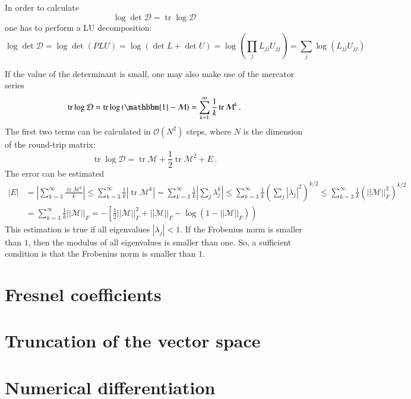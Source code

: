 \documentclass[superscriptaddress,prb]{revtex4-1}
\DeclareMathOperator{\trace}{tr}
\begin{document}
In order to calculate
\begin{equation}
\log\det\mathcal{D} = \trace\log\mathcal{D}
\end{equation}
one has to perform a LU decomposition:
\begin{equation}
\log\det\mathcal{D} = \log\det\left(PLU\right) = \log\left(\det L + \det U\right) = \log\left(\prod_j L_{jj} U_{jj}\right) = \sum_j \log\left(L_{jj} U_{jj}\right)
\end{equation}

If the value of the determinant is small, one may also make use of the mercator series
\begin{equation}
\trace\log \mathcal{D} = \trace\log\left(\mathbbm{1}-\mathcal{M}\right) = \sum_{k=1}^\infty \frac{1}{k} \trace\mathcal{M}^k \,.
\end{equation}
The first two terms can be calculated in $\mathcal{O}(N^2)$ steps, where $N$ is the dimension of the round-trip matrix:
\begin{equation}
\trace\log\mathcal{D} = \trace\mathcal{M} + \frac{1}{2} \trace\mathcal{M}^2 + E \,.
\end{equation}
The error can be estimated
\begin{align}
|E| &=  \left|\sum_{k=3}^\infty \frac{\trace\mathcal{M}^k}{k}\right|
\le \sum_{k=3}^\infty \frac{1}{k} \left| \trace\mathcal{M}^k \right|
= \sum_{k=3}^\infty \frac{1}{k} \left| \sum_j \lambda_j^k \right|
\le \sum_{k=3}^\infty \frac{1}{k} \left(\sum_j |\lambda_j|^2\right)^{k/2}
\le \sum_{k=3}^\infty \frac{1}{k} \left(||\mathcal{M}||_F^2\right)^{k/2} \\
&= \sum_{k=3}^\infty \frac{1}{k} ||\mathcal{M}||_F = -\left[\frac{1}{2}||\mathcal{M}||_F^2+||\mathcal{M}||_F -\log\left(1-||\mathcal{M}||_F\right)\right)
\end{align}
This estimation is true if all eigenvalues $|\lambda_j| < 1$. If the Frobenius
norm is smaller than $1$, then the modulus of all eigenvalues is smaller than
one. So, a sufficient condition is that the Frobenius norm is smaller than $1$.

\section{Fresnel coefficients}
\section{Truncation of the vector space}

\section{Numerical differentiation}
\end{document}
